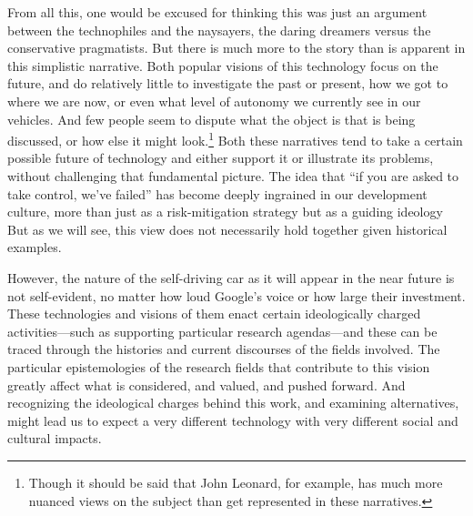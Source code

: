 From all this, one would be excused for thinking this was just an
argument between the technophiles and the naysayers, the daring dreamers versus the
conservative pragmatists. But there is much more to the story than is
apparent in this simplistic narrative. Both popular visions of this
technology focus on the future, and do relatively little to
investigate the past or present, how we got to 
where we are now, or even what level of autonomy we currently see in
our vehicles. And few people seem to dispute what the object is that is
being discussed, or how else it might look.\footnote{Though it should
  be said that John Leonard, for example, has much more nuanced views
  on the subject than get represented in these narratives.} Both these narratives 
tend to take a certain possible future of technology and either support it
or illustrate its problems, without challenging that fundamental
picture. The idea that ``if you are asked to take control, we've
failed'' has become deeply ingrained in our development
culture, more than just as a risk-mitigation strategy but as a guiding
ideology But as we will see, this view does not necessarily hold together given
historical examples.



However, the nature of the self-driving car as it will appear in
the near future is not self-evident, no matter how loud Google's voice
or how large their investment. These technologies and visions of them
enact certain ideologically charged activities---such as supporting
particular research agendas---and these can be traced through the
histories and current discourses of the fields involved.
The particular epistemologies of the research fields that contribute
to this vision greatly affect what is considered, and valued, and
pushed forward. And recognizing the ideological charges behind this
work, and examining alternatives, might lead us to expect a very
different technology with very
different social and cultural impacts. 


